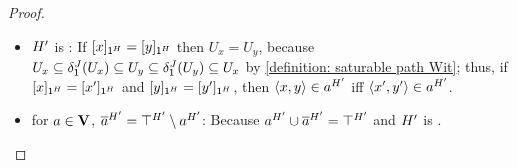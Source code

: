 \begin{proof}
\begin{itemize}
       By \ref{definition: saturable path Con}, if $\tuple{\quo{x}_{\id^{\graph[2]}}, \quo{y}_{\id^{\graph[2]}}} \in \com{a}^{\graph[2]^{\FillQ}}$, then $\tuple{\quo{x}_{\id^{\graph[2]}}, \quo{y}_{\id^{\graph[2]}}} \not\in a^{\graph[2]^{\FillQ}}$.
       \item $\graph[2]'$ is :
       If $\quo{x}_{\id^{\graph[2]}} = \quo{y}_{\id^{\graph[2]}}$ then $U_{x} = U_{y}$, because $U_{x} \subseteq \delta_{\id}^{\graph[3]}(U_{x}) \subseteq U_{y} \subseteq \delta_{\id}^{\graph[3]}(U_{y}) \subseteq U_{x}$ by \ref{definition: saturable path Wit}; thus, if $\quo{x}_{\id^{\graph[2]}} = \quo{x'}_{\id^{\graph[2]}}$ and $\quo{y}_{\id^{\graph[2]}} = \quo{y'}_{\id^{\graph[2]}}$, then $\tuple{x, y} \in a^{\graph[2]'}$ iff $\tuple{x', y'} \in a^{\graph[2]'}$.

       \item for $a \in \mathbf{V}$, $\com{a}^{\graph[2]'} = \top^{\graph[2]'} \setminus a^{\graph[2]'}$:
       Because $a^{\graph[2]'} \cup \com{a}^{\graph[2]'} = \top^{\graph[2]'}$ and $\graph[2]'$ is .
       

\end{itemize}
\end{proof}
